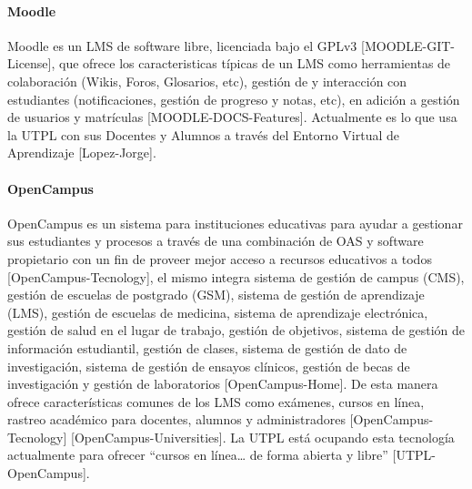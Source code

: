\paragraph{Moodle}
Moodle es un LMS de software libre, licenciada bajo el GPLv3 [MOODLE-GIT-License],  que ofrece los caracteristicas típicas de un LMS como herramientas de colaboración (Wikis, Foros, Glosarios, etc), gestión de y interacción con estudiantes (notificaciones, gestión de progreso y notas, etc), en adición a gestión de usuarios y matrículas [MOODLE-DOCS-Features]. Actualmente es lo que usa la UTPL con sus Docentes y Alumnos a través del Entorno Virtual de Aprendizaje [Lopez-Jorge].

\paragraph{OpenCampus}
OpenCampus es un sistema para instituciones educativas para ayudar a gestionar sus estudiantes y procesos a través de una combinación de OAS y software propietario con un fin de proveer mejor acceso a recursos educativos a todos [OpenCampus-Tecnology], el mismo integra sistema de gestión de campus (CMS), gestión de escuelas de postgrado (GSM), sistema de gestión de aprendizaje (LMS), gestión de escuelas de medicina, sistema de aprendizaje electrónica, gestión de salud en el lugar de trabajo, gestión de objetivos, sistema de gestión de información estudiantil, gestión de clases, sistema de gestión de dato de investigación, sistema de gestión de ensayos clínicos, gestión de becas de investigación y gestión de laboratorios [OpenCampus-Home]. De esta manera ofrece características comunes de los LMS como exámenes, cursos en línea, rastreo académico para docentes, alumnos y administradores [OpenCampus-Tecnology] [OpenCampus-Universities]. La UTPL está ocupando esta tecnología actualmente para ofrecer “cursos en línea… de forma abierta y libre” [UTPL-OpenCampus].

